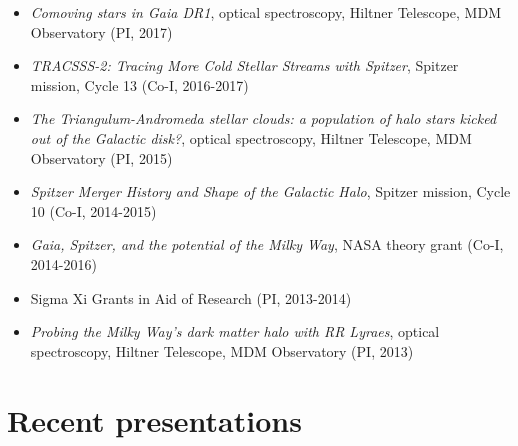 \documentclass[12pt,letterpaper]{article}
\begin{document}
	\begin{itemize}
    \item {\it Comoving stars in Gaia DR1}, optical spectroscopy, Hiltner Telescope, MDM Observatory (PI, 2017)
    \item {\it TRACSSS-2: Tracing More Cold Stellar Streams with Spitzer}, Spitzer mission, Cycle 13 (Co-I, 2016-2017)
	\item {\it The Triangulum-Andromeda stellar clouds: a population of halo stars kicked out of the Galactic disk?}, optical spectroscopy, Hiltner Telescope, MDM Observatory (PI, 2015)
	\item {\it Spitzer Merger History and Shape of the Galactic Halo}, Spitzer mission, Cycle 10 (Co-I, 2014-2015)
	\item {\it Gaia, Spitzer, and the potential of the Milky Way}, NASA theory grant (Co-I, 2014-2016)
	\item Sigma Xi Grants in Aid of Research (PI, 2013-2014)
	\item {\it Probing the Milky Way's dark matter halo with RR Lyraes}, optical spectroscopy, Hiltner Telescope, MDM Observatory (PI, 2013)
	\end{itemize}

\section*{Recent presentations}
\end{document}
